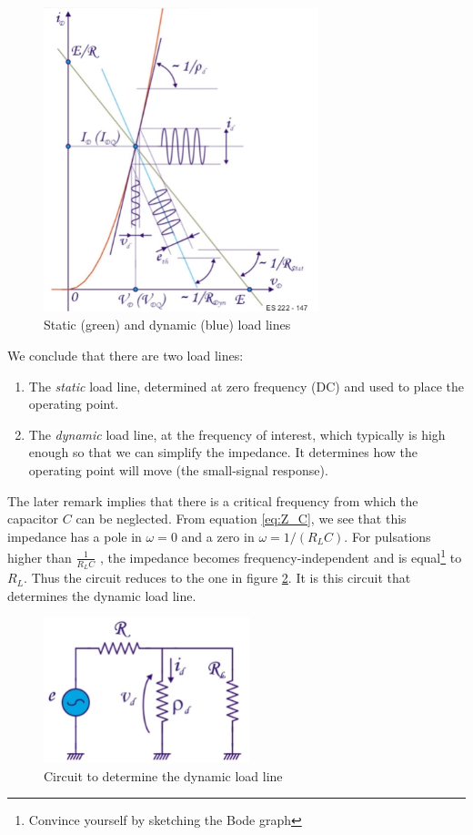 \begin{figure}[h!]
	\centering
	\includegraphics[width=8cm]{figures/ch02/loadline5.jpg}
	\caption{Static (green) and dynamic (blue) load lines}
	\label{fig:loadline5}
\end{figure}
We conclude that there are two load lines:
\begin{enumerate}
	\item The \emph{static} load line, determined at zero frequency (DC) and used to place the operating point.
	\item The \emph{dynamic} load line, at the frequency of interest, which typically is high enough so that we can simplify the impedance. It determines how the operating point will move (the small-signal response).
\end{enumerate}
The later remark implies that there is a critical frequency from which the capacitor $C$ can be neglected. From equation \ref{eq:Z_C}, we see that this impedance has a pole in $\omega=0$ and a zero in $\omega = 1/(R_L C)$. For pulsations higher than $\frac{1}{R_L C}$ , the impedance becomes frequency-independent and is equal\footnote{Convince yourself by sketching the Bode graph} to $R_L$. Thus the circuit reduces to the one in figure \ref{fig:loadline6}. It is this circuit that determines the dynamic load line.

\begin{figure}[h!]
	\centering
	\includegraphics[width=6cm]{figures/ch02/loadline6.jpg}
	\caption{Circuit to determine the dynamic load line}
	\label{fig:loadline6}
\end{figure}

